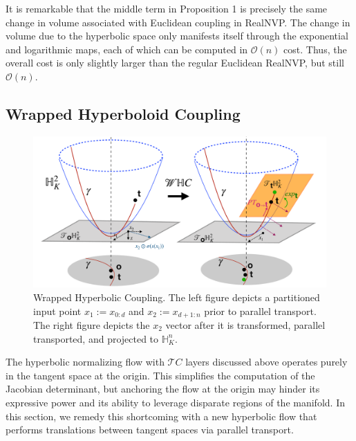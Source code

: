It is remarkable that the middle term in Proposition 1 is precisely the same change in volume associated with Euclidean coupling in RealNVP.
The change in volume due to the hyperbolic space only manifests itself through the exponential and logarithmic maps, each of which can be computed in $\mathcal{O}(n)$ cost. Thus, the overall cost is only slightly larger than the regular Euclidean RealNVP, but still $\mathcal{O}(n)$.



\subsection{Wrapped Hyperboloid Coupling}
\begin{figure}[ht]
    \centering
    \includegraphics[width=\linewidth]{hyperbolic_flows_arch.pdf}
    \vspace{-5mm}
    \caption{Wrapped Hyperbolic Coupling. The left figure depicts a partitioned input point $x_1:=x_{0:d}$ and $x_2:=x_{d+1:n}$ prior to parallel transport. The right figure depicts the $x_2$ vector after it is transformed, parallel transported, and projected to $\mathbb{H}^n_K$.}
    \vspace{-5pt}
    \label{fig:whc_architecture_diagram}
\end{figure}

\label{wrapped_hyerboloid_coupling_section}
The hyperbolic normalizing flow with $\mathcal{T}C$ layers discussed above operates purely in the tangent space at the origin.
This simplifies the computation of the Jacobian determinant, but anchoring the flow at the origin may hinder its expressive power and its ability to leverage disparate regions of the manifold. 
In this section, we remedy this shortcoming with a new hyperbolic flow that performs translations between tangent spaces via parallel transport. 

